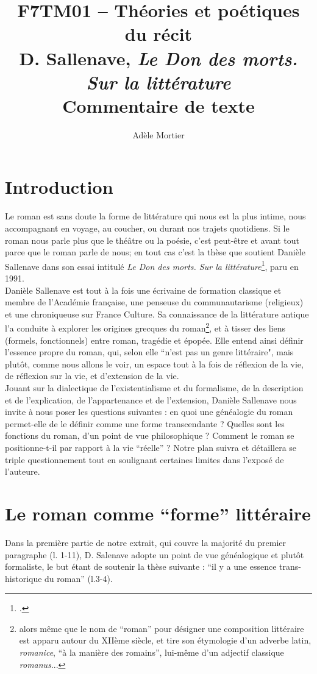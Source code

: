 \documentclass[a4paper,10pt]{article}
\title{F7TM01 -- Théories et poétiques du récit\\
	 D. Sallenave, \textit{Le Don des morts. Sur la littérature}\\ \vspace{0.3cm}
	 \small Commentaire de texte}
\author{Adèle Mortier}
\begin{document}
	\maketitle
	\nocite{*}
	\section*{Introduction}
		Le roman est sans doute la forme de littérature qui nous est la plus intime, nous accompagnant en voyage, au coucher, ou durant nos trajets quotidiens. Si le roman nous parle plus que le théâtre ou la poésie, c'est peut-être et avant tout parce que le roman parle de nous; en tout cas c'est la thèse que soutient Danièle Sallenave dans son essai intitulé \textit{Le Don des morts. Sur la littérature}\footcite{Sallenave1991}, paru en 1991.\\
		Danièle Sallenave est tout à la fois une écrivaine de formation classique et membre de l'Académie française, une penseuse du communautarisme (religieux) et une chroniqueuse sur France Culture. Sa connaissance de la littérature antique l'a conduite à explorer les origines grecques du roman\footnote{alors même que le nom de ``roman'' pour désigner une composition littéraire est apparu autour du XIIème siècle, et tire son étymologie d’un adverbe latin, \textit{romanice}, ``à la manière des romains'', lui-même d’un adjectif classique \textit{romanus}...}, et à tisser des liens (formels, fonctionnels) entre roman, tragédie et épopée. Elle entend ainsi définir l'essence propre du roman, qui, selon elle ``n'est pas un genre littéraire", mais plutôt, comme nous allons le voir, un espace tout à la fois de réflexion de la vie, de réflexion sur la vie, et d'extension de la vie.\\
		Jouant sur la dialectique de l'existentialisme et du formalisme, de la description et de l'explication, de l'appartenance et de l'extension, Danièle Sallenave nous invite à nous poser les questions suivantes : en quoi une généalogie du roman permet-elle de le définir comme une forme transcendante ? Quelles sont les fonctions du roman, d'un point de vue philosophique ? Comment le roman se positionne-t-il par rapport à la vie ``réelle'' ? Notre plan suivra et détaillera se triple questionnement tout en soulignant certaines limites dans l'exposé de l'auteure.
		
		
	\section{Le roman comme ``forme'' littéraire}
		Dans la première partie de notre extrait, qui couvre la majorité du premier paragraphe (l. 1-11), D. Salenave adopte un point de vue généalogique et plutôt formaliste, le but étant de soutenir la thèse suivante : ``il y a une essence trans-historique du roman'' (l.3-4).
\end{document}
